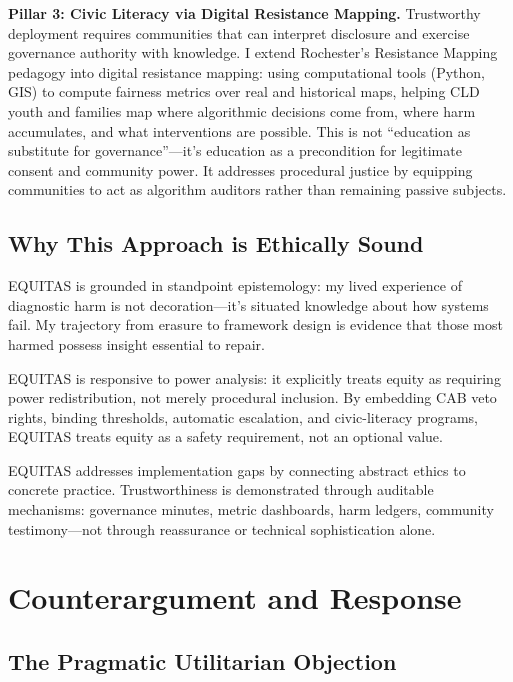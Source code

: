 \documentclass[12pt,a4paper]{article}
\begin{document}
\textbf{Pillar 3: Civic Literacy via Digital Resistance Mapping.} Trustworthy deployment requires communities that can interpret disclosure and exercise governance authority with knowledge. I extend Rochester's Resistance Mapping pedagogy into digital resistance mapping: using computational tools (Python, GIS) to compute fairness metrics over real and historical maps, helping CLD youth and families map where algorithmic decisions come from, where harm accumulates, and what interventions are possible. This is not ``education as substitute for governance''—it's education as a precondition for legitimate consent and community power. It addresses procedural justice by equipping communities to act as algorithm auditors rather than remaining passive subjects.

\subsection{Why This Approach is Ethically Sound}

EQUITAS is grounded in standpoint epistemology: my lived experience of diagnostic harm is not decoration—it's situated knowledge about how systems fail. My trajectory from erasure to framework design is evidence that those most harmed possess insight essential to repair.\cite{garcia_ed415}

EQUITAS is responsive to power analysis: it explicitly treats equity as requiring power redistribution, not merely procedural inclusion. By embedding CAB veto rights, binding thresholds, automatic escalation, and civic-literacy programs, EQUITAS treats equity as a safety requirement, not an optional value.

EQUITAS addresses implementation gaps by connecting abstract ethics to concrete practice. Trustworthiness is demonstrated through auditable mechanisms: governance minutes, metric dashboards, harm ledgers, community testimony—not through reassurance or technical sophistication alone.

\section{Counterargument and Response}


\subsection{The Pragmatic Utilitarian Objection}
\end{document}
